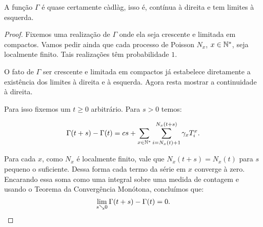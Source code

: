 \begin{proposicao}
  \label{prop:gamma-cadlag}
  A função $\Gamma$ é quase certamente càdlàg, isso é, contínua à
  direita e tem limites à esquerda.
\end{proposicao}
\begin{proof}

  Fixemos uma realização de $\Gamma$ onde ela seja crescente e
  limitada em compactos. Vamos pedir ainda que cada processo de
  Poisson $N_x$, $x \in {\mathbb{N^*}}$, seja localmente finito. Tais realizações
  têm probabilidade $1$.

  O fato de $\Gamma$ ser crescente e limitada em compactos já
  estabelece diretamente a existência dos limites à direita e à
  esquerda. Agora resta mostrar a continuidade à direita.

  Para isso fixemos um $t \geq 0$ arbitrário. Para $s > 0$ temos:

  \begin{equation*}
    \Gamma(t+s) - \Gamma(t) = 
    c s + 
    \sum_{x \in {\mathbb{N^*}}} \sum_{i = N_x(t)+1}^{N_x(t+s)} \gamma_x T^x_i.
  \end{equation*}

  Para cada $x$, como $N_x$ é localmente finito, vale que $N_x(t+s) =
  N_x(t)$ para $s$ pequeno o suficiente. Dessa forma cada termo da
  série em $x$ converge à zero. Encarando essa soma como uma
  integral sobre uma medida de contagem e usando o Teorema da
  Convergência Monótona, concluímos que:
  \begin{displaymath}
    \lim_{s \searrow 0} \Gamma(t+s) - \Gamma(t) = 0.
    \qedhere
  \end{displaymath}
\end{proof}

